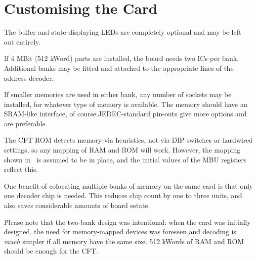 \section{Customising the Card}

The buffer and state-displaying LEDs are completely optional and may be left
out entirely.

If 4 MBit (512 kWord) parts are installed, the board needs two ICs per
bank. Additional banks may be fitted and attached to the appropriate lines of
the address decoder.

If smaller memories are used in either bank, any number of sockets may be
installed, for whatever type of memory is available. The memory should have an
SRAM-like interface, of course.JEDEC-standard pin-outs give more options and
are preferable.

The CFT ROM detects memory via heuristics, not via DIP switches or hardwired
settings, so any mapping of RAM and ROM will work. However, the mapping shown
in~ is assumed to be in place, and the initial values of
the \gls{MBU} registers reflect this.

One benefit of colocating multiple banks of memory on the same card is that
only one decoder chip is needed. This reduces chip count by one to three units,
and also saves considerable amounts of board estate.

Please note that the two-bank design was intentional: when the card was
initially designed, the need for memory-mapped devices was foreseen and
decoding is {\em much\/} simpler if all memory have the same size. 512 kWords
of RAM and ROM should be enough for the CFT.


